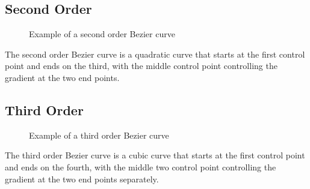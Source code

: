 \documentclass[a5paper,12pt]{book}
\begin{document}
\subsection{Second Order}
\begin{figure}[h]
    \centering
    
    \caption{Example of a second order Bezier curve} \label{fig:example-second}
\end{figure}
The second order Bezier curve is a quadratic curve that starts at the first control point and ends on the third, with the middle control point controlling the gradient at the two end points.
\subsection{Third Order}
\begin{figure}[h]
    \centering
    
    \caption{Example of a third order Bezier curve} \label{fig:example-third}
\end{figure}
The third order Bezier curve is a cubic curve that starts at the first control point and ends on the fourth, with the middle two control point controlling the gradient at the two end points separately.
\clearpage
{}
\printindex
\end{document}
